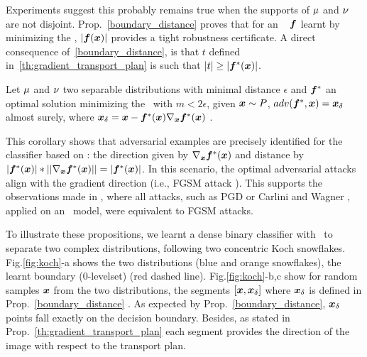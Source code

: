 Experiments suggest this probably remains true when the supports of $\mu$ and $\nu$  are not disjoint. %
Prop.~\ref{boundary_distance} proves that for an \otnn~ $\bm{f}$ learnt by minimizing  the \losshkr, $|\bm{f}(\bm{x})|$ provides a tight robustness certificate. A direct consequence of~\ref{boundary_distance}, is  that $t$ defined in~\ref{th:gradient_transport_plan} is such that $|t|\geq|\bm{f}^*(\bm{x})|$.

\begin{corollary}\label{fx_grad_adversarial}
Let $\mu$ and $\nu$ two separable distributions with minimal distance $\epsilon$ and  $\bm{f}^*$ an optimal solution minimizing the \losshkr~with $m<2\epsilon$, given $\bm{x} \sim P$,  %
$adv(\bm{f}^*,\bm{x}) = \bm{x}_{\delta}$ %
almost surely, where $\bm{x}_\delta = \bm{x} -\bm{f}^*(\bm{x}) \nabla_{\bm{x}} \bm{f}^*(\bm{x})$ .
\end{corollary}

This corollary shows that adversarial examples are precisely identified for the classifier based on \losshkr: the direction given by $\nabla_{\bm{x}} \bm{f}^*(\bm{x})$ and distance by $|\bm{f}^*(\bm{x})|*||\nabla_{\bm{x}} \bm{f}^*(\bm{x})||=|\bm{f}^*(\bm{x})|$. In this scenario, the optimal adversarial attacks align with the gradient direction (i.e., FGSM attack \cite{Goodfellow2014a}). This supports the observations made in \cite{serrurier2021achieving}, where all attacks, such as PGD \cite{Madry2017} or Carlini and Wagner \cite{carlini2017towards}, applied on an \otnn~model, were equivalent to FGSM attacks.

To illustrate these propositions, we learnt a dense binary classifier with \losshkr~to separate two complex distributions, following two concentric Koch snowflakes. Fig.\ref{fig:koch}-a shows the two distributions (blue and orange snowflakes), the learnt boundary ($0$-levelset) (red dashed line). Fig.\ref{fig:koch}-{b,c} show for random samples $\bm{x}$ from the two distributions, the segments $[\bm{x},\bm{x}_\delta]$ where $\bm{x}_\delta$ is defined in Prop.~\ref{boundary_distance} . %
As expected by Prop.~\ref{boundary_distance},  $\bm{x}_\delta$ points fall exactly on the decision boundary. Besides, as stated in Prop.~\ref{th:gradient_transport_plan} each segment provides the direction of the image with respect to the transport plan.

